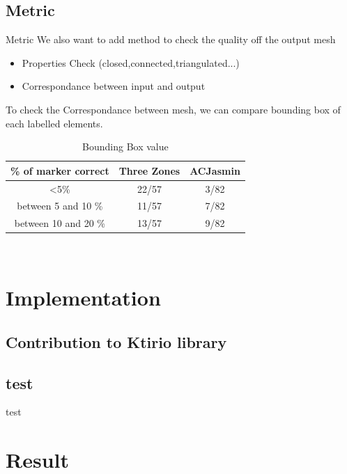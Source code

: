 \documentclass[10pt]{beamer}
\begin{document}
\subsection{Metric}
\begin{frame}{Metric}
We also want to add method to check the quality off the output mesh
\begin{itemize}
    \item Properties Check (closed,connected,triangulated...)
    \item Correspondance between input and output
\end{itemize}
To check the Correspondance between mesh, we can compare 
bounding box of each labelled elements.

\begin{table}[h]
    \centering
    \caption{Bounding Box value}
    \begin{tabular}{|c|c|c|}
        \hline
         \% of marker correct & Three Zones & ACJasmin \\
        \hline
        <5\% & 22/57 & 3/82 \\
        between 5 and 10 \% & 11/57 & 7/82 \\
        between 10 and 20 \% & 13/57  & 9/82 \\
        \hline
    \end{tabular}
\end{table}
    
\end{frame}

\
\section{Implementation}
\subsection{Contribution to Ktirio library}
\begin{frame}
    
\end{frame}

\subsection{test}
\begin{frame}{test}
\end{frame}

\section{Result}
\end{document}
